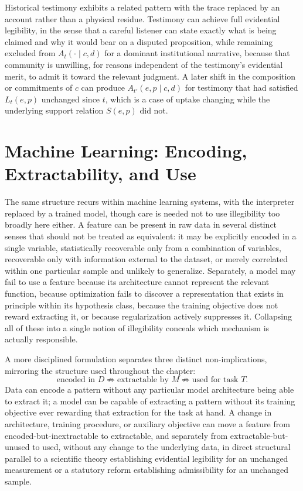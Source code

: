 Historical testimony exhibits a related pattern with the trace replaced by an account rather than a physical residue. Testimony can achieve full evidential legibility, in the sense that a careful listener can state exactly what is being claimed and why it would bear on a disputed proposition, while remaining excluded from $A_t(\cdot \mid c,d)$ for a dominant institutional narrative, because that community is unwilling, for reasons independent of the testimony's evidential merit, to admit it toward the relevant judgment. A later shift in the composition or commitments of $c$ can produce $A_{t'}(e,p \mid c,d)$ for testimony that had satisfied $L_t(e,p)$ unchanged since $t$, which is a case of uptake changing while the underlying support relation $S(e,p)$ did not.

\section{Machine Learning: Encoding, Extractability, and Use}

The same structure recurs within machine learning systems, with the interpreter replaced by a trained model, though care is needed not to use illegibility too broadly here either. A feature can be present in raw data in several distinct senses that should not be treated as equivalent: it may be explicitly encoded in a single variable, statistically recoverable only from a combination of variables, recoverable only with information external to the dataset, or merely correlated within one particular sample and unlikely to generalize. Separately, a model may fail to use a feature because its architecture cannot represent the relevant function, because optimization fails to discover a representation that exists in principle within its hypothesis class, because the training objective does not reward extracting it, or because regularization actively suppresses it. Collapsing all of these into a single notion of illegibility conceals which mechanism is actually responsible.

A more disciplined formulation separates three distinct non-implications, mirroring the structure used throughout the chapter:
\[
\text{encoded in } D \not\Rightarrow \text{extractable by } M \not\Rightarrow \text{used for task } T.
\]
Data can encode a pattern without any particular model architecture being able to extract it; a model can be capable of extracting a pattern without its training objective ever rewarding that extraction for the task at hand. A change in architecture, training procedure, or auxiliary objective can move a feature from encoded-but-inextractable to extractable, and separately from extractable-but-unused to used, without any change to the underlying data, in direct structural parallel to a scientific theory establishing evidential legibility for an unchanged measurement or a statutory reform establishing admissibility for an unchanged sample.

